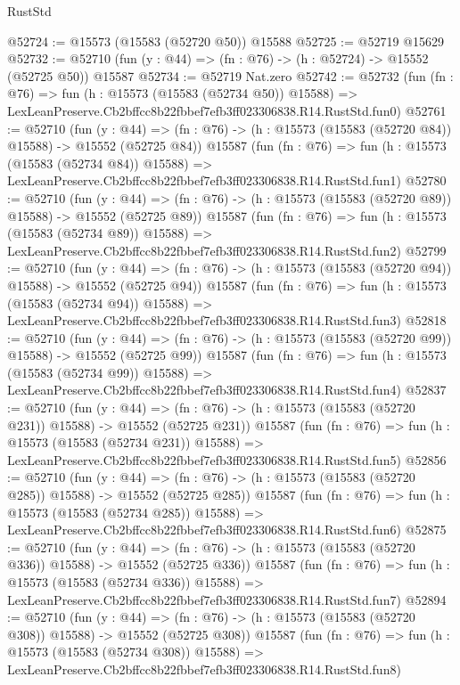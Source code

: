 \begin{lexlean}{RustStd}
\begin{coremodule}
@52724 := @15573 (@15583 (@52720 @50)) @15588
@52725 := @52719 @15629
@52732 := @52710 (fun (y : @44) => (fn : @76) -> (h : @52724) -> @15552 (@52725 @50)) @15587
@52734 := @52719 Nat.zero
@52742 := @52732
    (fun (fn : @76) =>
    fun (h : @15573 (@15583 (@52734 @50)) @15588) =>
    LexLeanPreserve.Cb2bffcc8b22fbbef7efb3ff023306838.R14.RustStd.fun0)
@52761 := @52710
    (fun (y : @44) =>
    (fn : @76) -> (h : @15573 (@15583 (@52720 @84)) @15588) -> @15552 (@52725 @84))
    @15587
    (fun (fn : @76) =>
    fun (h : @15573 (@15583 (@52734 @84)) @15588) =>
    LexLeanPreserve.Cb2bffcc8b22fbbef7efb3ff023306838.R14.RustStd.fun1)
@52780 := @52710
    (fun (y : @44) =>
    (fn : @76) -> (h : @15573 (@15583 (@52720 @89)) @15588) -> @15552 (@52725 @89))
    @15587
    (fun (fn : @76) =>
    fun (h : @15573 (@15583 (@52734 @89)) @15588) =>
    LexLeanPreserve.Cb2bffcc8b22fbbef7efb3ff023306838.R14.RustStd.fun2)
@52799 := @52710
    (fun (y : @44) =>
    (fn : @76) -> (h : @15573 (@15583 (@52720 @94)) @15588) -> @15552 (@52725 @94))
    @15587
    (fun (fn : @76) =>
    fun (h : @15573 (@15583 (@52734 @94)) @15588) =>
    LexLeanPreserve.Cb2bffcc8b22fbbef7efb3ff023306838.R14.RustStd.fun3)
@52818 := @52710
    (fun (y : @44) =>
    (fn : @76) -> (h : @15573 (@15583 (@52720 @99)) @15588) -> @15552 (@52725 @99))
    @15587
    (fun (fn : @76) =>
    fun (h : @15573 (@15583 (@52734 @99)) @15588) =>
    LexLeanPreserve.Cb2bffcc8b22fbbef7efb3ff023306838.R14.RustStd.fun4)
@52837 := @52710
    (fun (y : @44) =>
    (fn : @76) -> (h : @15573 (@15583 (@52720 @231)) @15588) -> @15552 (@52725 @231))
    @15587
    (fun (fn : @76) =>
    fun (h : @15573 (@15583 (@52734 @231)) @15588) =>
    LexLeanPreserve.Cb2bffcc8b22fbbef7efb3ff023306838.R14.RustStd.fun5)
@52856 := @52710
    (fun (y : @44) =>
    (fn : @76) -> (h : @15573 (@15583 (@52720 @285)) @15588) -> @15552 (@52725 @285))
    @15587
    (fun (fn : @76) =>
    fun (h : @15573 (@15583 (@52734 @285)) @15588) =>
    LexLeanPreserve.Cb2bffcc8b22fbbef7efb3ff023306838.R14.RustStd.fun6)
@52875 := @52710
    (fun (y : @44) =>
    (fn : @76) -> (h : @15573 (@15583 (@52720 @336)) @15588) -> @15552 (@52725 @336))
    @15587
    (fun (fn : @76) =>
    fun (h : @15573 (@15583 (@52734 @336)) @15588) =>
    LexLeanPreserve.Cb2bffcc8b22fbbef7efb3ff023306838.R14.RustStd.fun7)
@52894 := @52710
    (fun (y : @44) =>
    (fn : @76) -> (h : @15573 (@15583 (@52720 @308)) @15588) -> @15552 (@52725 @308))
    @15587
    (fun (fn : @76) =>
    fun (h : @15573 (@15583 (@52734 @308)) @15588) =>
    LexLeanPreserve.Cb2bffcc8b22fbbef7efb3ff023306838.R14.RustStd.fun8)

\end{coremodule}
\end{lexlean}
